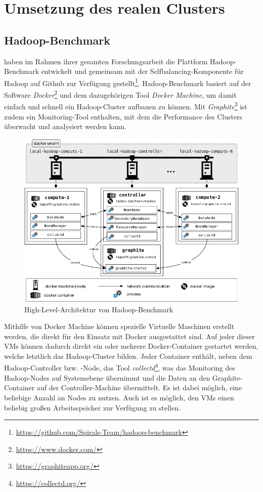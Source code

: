 \section{Umsetzung des realen Clusters}\label{sec:aufbauCluster}

\subsection{Hadoop-Benchmark}\label{sec:hadoopBenchmark}

\citeauthor{zhang2016} haben im Rahmen ihrer gesamten Forschungsarbeit die Plattform Hadoop-Benchmark entwickelt und gemeinsam mit der Selfbalancing-Komponente für Hadoop auf Github zur Verfügung gestellt\footnote{\url{https://github.com/Spirals-Team/hadoop-benchmark}}. Hadoop-Benchmark basiert auf der Software \emph{Docker}\footnote{\url{https://www.docker.com/}} und dem dazugehörigen Tool \emph{Docker Machine}, um damit einfach und schnell ein Hadoop-Cluster aufbauen zu können. Mit \emph{Graphite}\footnote{\url{https://graphiteapp.org/}} ist zudem ein Monitoring-Tool enthalten, mit dem die Performance des Clusters überwacht und analysiert werden kann.

\begin{figure}
    \centering
    \includegraphics[width=.8\columnwidth]{./images/hadoopBenchmarkArch.png}
    \caption[High-Level-Architektur von Hadoop-Benchmark]{High-Level-Architektur von Hadoop-Benchmark \cite{abb:hadoopBenchmarkArch}}
    \label{fig:hadoopBenchmarkArchitecture}
\end{figure}

Mithilfe von Docker Machine können spezielle Virtuelle Maschinen erstellt werden, die direkt für den Einsatz mit Docker ausgestattet sind. Auf jeder dieser VMs können dadurch direkt ein oder mehrere Docker-Container gestartet werden, welche letztlich das Hadoop-Cluster bilden. Jeder Container enthält, neben dem Hadoop-Controller bzw. -Node, das Tool \emph{collectd}\footnote{\url{https://collectd.org/}}, was das Monitoring des Hadoop-Nodes auf Systemebene übernimmt und die Daten an den Graphite-Container auf der Controller-Machine übermittelt. Es ist dabei möglich, eine beliebige Anzahl an Nodes zu nutzen. Auch ist es möglich, den VMs einen beliebig großen Arbeitsspeicher zur Verfügung zu stellen.

